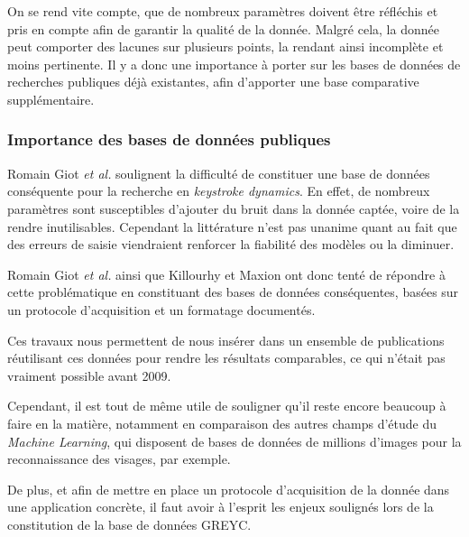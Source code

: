 On se rend vite compte, que de nombreux paramètres doivent être réfléchis et pris en compte afin de garantir la qualité de la donnée. Malgré cela, la donnée peut comporter des lacunes sur plusieurs points, la rendant ainsi incomplète et moins pertinente. Il y a donc une importance à porter sur les bases de données de recherches publiques déjà existantes, afin d'apporter une base comparative supplémentaire.

\subsubsection{Importance des bases de données publiques}

Romain Giot \textit{et al.}\cite{giotGREYC} soulignent la difficulté de constituer une base de données conséquente pour la recherche en \textit{keystroke dynamics}. En effet, de nombreux paramètres sont susceptibles d'ajouter du bruit dans la donnée captée, voire de la rendre inutilisables. Cependant la littérature n'est pas unanime quant au fait que des erreurs de saisie viendraient renforcer la fiabilité des modèles ou la diminuer.

Romain Giot \textit{et al.} \cite{giotGREYC} ainsi que Killourhy et Maxion \cite{killourhy2009} ont donc tenté de répondre à cette problématique en constituant des bases de données conséquentes, basées sur un protocole d'acquisition et un formatage documentés.

Ces travaux nous permettent de nous insérer dans un ensemble de publications réutilisant ces données pour rendre les résultats comparables, ce qui n'était pas vraiment possible avant 2009.

Cependant, il est tout de même utile de souligner qu'il reste encore beaucoup à faire en la matière, notamment en comparaison des autres champs d'étude du \textit{Machine Learning}, qui disposent de bases de données de millions d'images pour la reconnaissance des visages, par exemple.

De plus, et afin de mettre en place un protocole d'acquisition de la donnée dans une application concrète, il faut avoir à l'esprit les enjeux soulignés lors de la constitution de la base de données GREYC\cite{giotGREYC}.
